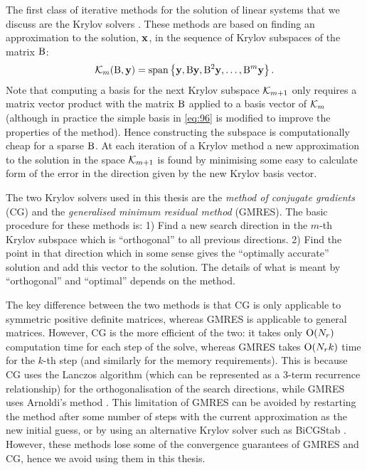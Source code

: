 The first class of iterative methods for the solution of linear systems that we discuss are the Krylov solvers \cite[151]{Saad2000}.
These methods are based on finding an approximation to the solution, $\boldsymbol{\mathrm{x}}$, in the sequence of Krylov subspaces of the matrix $\mathrm{B}$:
\begin{equation}
  \mathcal{K}_m(\mathrm{B}, \boldsymbol{\mathrm{y}}) = \operatorname{span} \left\{ {\boldsymbol{\mathrm{y}}, \mathrm{B} \boldsymbol{\mathrm{y}}, \mathrm{B}^2\boldsymbol{\mathrm{y}}, \ldots, \mathrm{B}^m\boldsymbol{\mathrm{y}}} \right\}.
  \label{eq:96}
\end{equation}
Note that computing a basis for the next Krylov subspace $\mathcal{K}_{m+1}$ only requires a matrix vector product with the matrix $\mathrm{B}$ applied to a basis vector of $\mathcal{K}_m$ (although in practice the simple basis in \cref{eq:96} is modified to improve the properties of the method).
Hence constructing the subspace is computationally cheap for a sparse $\mathrm{B}$.
At each iteration of a Krylov method a new approximation to the solution in the space $\mathcal{K}_{m+1}$ is found by minimising some easy to calculate form of the error in the direction given by the new Krylov basis vector.

The two Krylov solvers used in this thesis are the \emph{method of conjugate gradients} (CG) and the \emph{generalised minimum residual method} (GMRES).
The basic procedure for these methods is:
1) Find a new search direction in the $m$-th Krylov subspace which is ``orthogonal'' to all previous directions.
2) Find the point in that direction which in some sense gives the ``optimally accurate'' solution and add this vector to the solution.
The details of what is meant by ``orthogonal'' and ``optimal'' depends on the method.

The key difference between the two methods is that CG is only applicable to symmetric positive definite matrices, whereas GMRES is applicable to general matrices.
However, CG is the more efficient of the two: it takes only $\mathrm{O}{\left( N_r \right)}$ computation time for each step of the solve, whereas GMRES takes $\mathrm{O}{\left( N_r k \right)}$ time for the $k$-th step (and similarly for the memory requirements).
This is because CG uses the Lanczos algorithm (which can be represented as a 3-term recurrence relationship) for the orthogonalisation of the search directions, while GMRES uses Arnoldi's method \cite[153]{Saad2000}.
This limitation of GMRES can be avoided by restarting the method after some number of steps with the current approximation as the new initial guess, or by using an alternative Krylov solver such as BiCGStab \cite[172]{HowardElmanDavidSilvester2006}.
However, these methods lose some of the convergence guarantees of GMRES and CG, hence we avoid using them in this thesis.

